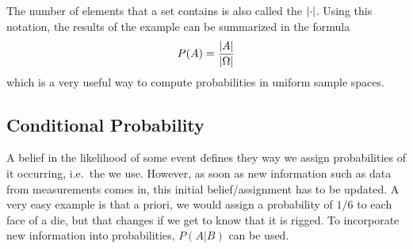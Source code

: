 The number of elements that a set contains is also called the  $\abs{\cdot}$. Using this notation, the results of the example can be summarized in the formula
\begin{equation}
P(A) = \frac{\abs{A}}{\abs{\Omega}}
\end{equation}
which is a very useful way to compute probabilities in uniform sample spaces.



	\subsection{Conditional Probability}
A belief in the likelihood of some event defines they way we assign probabilities of it occurring, i.e.~the  we use. However, as soon as new information such as data from measurements comes in, this initial belief/assignment has to be updated. A very easy example is that a priori, we would assign a probability of $1 / 6$ to each face of a die, but that changes if we get to know that it is rigged. To incorporate new information into probabilities,  $P(A | B)$ can be used.



